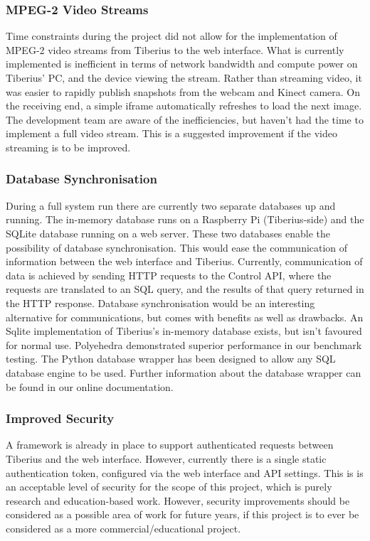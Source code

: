 \subsubsection{MPEG-2 Video Streams}
Time constraints during the project did not allow for the implementation of
\gls{MPEG-2} video streams from Tiberius to the web interface.
\newline
What is currently implemented is inefficient in terms of network bandwidth and compute power on Tiberius' PC, and the device viewing the stream. Rather than streaming video, it was easier to rapidly publish snapshots from the webcam and Kinect camera. On the receiving end, a simple iframe automatically refreshes to load the next image.
\newline
The development team are aware of the inefficiencies, but haven't had the time to implement a full video stream. This is a suggested improvement if the video streaming is to be improved.

\subsubsection{Database Synchronisation}
During a full system run there are currently two separate databases up and
running. The in-memory database runs on a Raspberry Pi (Tiberius-side) and the
SQLite database running on a web server. These two databases enable the
possibility of database synchronisation. This would ease the communication of
information between the web interface and Tiberius. Currently, communication of
data is achieved by sending HTTP requests to the Control API, where the
requests are translated to an SQL query, and the results of that query returned
in the HTTP response.
\newline
Database synchronisation would be an interesting alternative for communications,
but comes with benefits as well as drawbacks.
\newline
An Sqlite implementation of Tiberius's in-memory database exists, but isn't
favoured for normal use. Polyehedra demonstrated superior performance in
our benchmark testing. The Python database wrapper has been designed to allow
any SQL database engine to be used. Further information about the database
wrapper can be found in our online documentation.


\subsubsection{Improved Security}
A framework is already in place to support authenticated requests between
Tiberius and the web interface. However, currently there is a single static authentication token, configured via the web interface and API settings.
\newline
This is is an acceptable level of security for the scope of this project, which
is purely research and education-based work. However, security improvements
should be considered as a possible area of work for future years, if this
project is to ever be considered as a more commercial/educational project.

